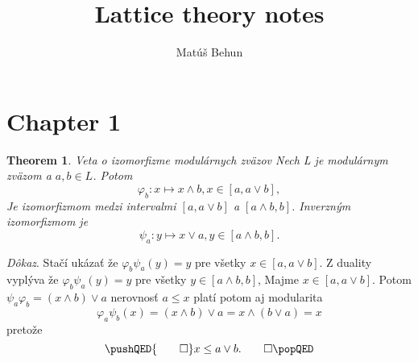 \documentclass[a4paper,12pt,oneside]{report}%
\author{Mat\'u\v{s} Behun}
\title{Lattice theory notes}
\newtheorem{theorem}{Theorem}
\begin{document}
\section{Chapter 1}

\begin{theorem} \emph{Veta o izomorfizme modulárnych zväzov}
Nech L je modulárnym zväzom a $a, b \in L$. Potom
    \begin{equation}
        \varphi_{b}: x \mapsto x \wedge b, x \in [a, a \vee b],
    \end{equation}
Je izomorfizmom medzi intervalmi $[a, a \vee b]$ a $[ a \wedge b, b]$.
Inverzným izomorfizmom je
    \begin{equation}
        \psi_{a}: y \mapsto x \vee a, y \in [a \wedge b, b].
    \end{equation}
\end{theorem}
\emph{Dôkaz}.
Stačí ukázať že $\varphi_{b}\psi_{a}(y) = y$ pre všetky $x \in [a, a \vee b]$.
Z duality vyplýva že $\varphi_{b}\psi_{a}(y) = y$ pre všetky
    $y \in [a \wedge b, b]$,
Majme $x \in [a, a \vee b]$. Potom
    $\psi_{a}\varphi_{b} = ( x \wedge b ) \vee a$ nerovnosť $a \leq x$ platí
    potom aj modularita
    \begin{equation}
        \varphi_{a}\psi_{b}(x) =
        ( x \wedge b ) \vee a =
        x \wedge ( b \vee a) =
        x
    \end{equation}
    pretože
    \[
        \pushQED{\qed}
        x \leq a \vee b. \qedhere
        \popQED
    \]
\end{document}
